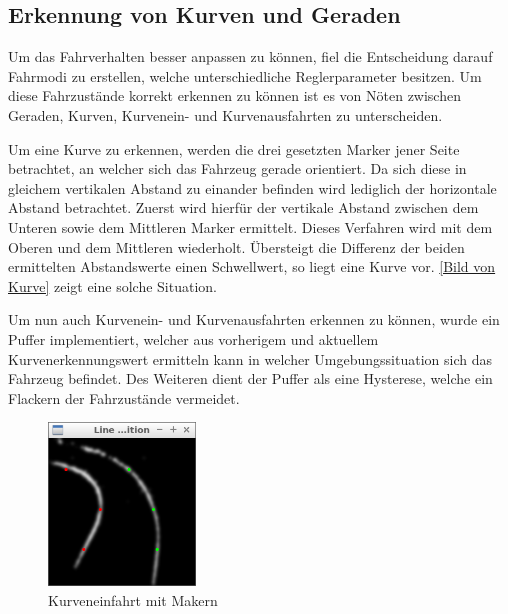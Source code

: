 \subsection{Erkennung von Kurven und Geraden}
\label{sec:kurvenerkennung}
Um das Fahrverhalten besser anpassen zu können, fiel die Entscheidung darauf Fahrmodi zu erstellen, welche unterschiedliche Reglerparameter besitzen. Um diese Fahrzustände korrekt erkennen zu können ist es von Nöten zwischen Geraden, Kurven, Kurvenein- und Kurvenausfahrten zu unterscheiden.

Um eine Kurve zu erkennen, werden die drei gesetzten Marker jener Seite betrachtet, an welcher sich das Fahrzeug gerade orientiert. Da sich diese in gleichem vertikalen Abstand zu einander befinden wird lediglich der horizontale Abstand betrachtet. Zuerst wird hierfür der vertikale Abstand zwischen dem Unteren sowie dem Mittleren Marker ermittelt. Dieses Verfahren wird mit dem Oberen und dem Mittleren wiederholt. Übersteigt die Differenz der beiden ermittelten Abstandswerte einen Schwellwert, so liegt eine Kurve vor. \autoref{Bild von Kurve} zeigt eine solche Situation.

Um nun auch Kurvenein- und Kurvenausfahrten erkennen zu können, wurde ein Puffer implementiert, welcher aus vorherigem und aktuellem Kurvenerkennungswert ermitteln kann in welcher Umgebungssituation sich das Fahrzeug befindet. Des Weiteren dient der Puffer als eine Hysterese, welche ein Flackern der Fahrzustände vermeidet.

\begin{figure}[ht]
	\centering
	\includegraphics[width=0.35\textwidth]{images/curve_bw.png}
	\caption{Kurveneinfahrt mit Makern}
\end{figure}
\label{Bild von Kurve}

